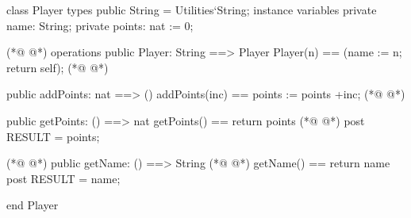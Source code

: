\begin{vdmpp}[breaklines=true]
class Player
types
public String = Utilities`String;
instance variables
   private name: String;
   private points: nat := 0;

(*@
\label{Player:8}
@*)
operations
   public Player: String ==> Player
   Player(n) == (name := n; return self); 
(*@
\label{addAttempts:11}
@*)
   
   public addPoints: nat ==> ()
   addPoints(inc) == points := points +inc;   
(*@
\label{addPoints:14}
@*)
   
   public getPoints: () ==> nat
    getPoints() == return points
(*@
\label{getPoints:17}
@*)
   post RESULT = points;

(*@
\label{getName:19}
@*)
   public getName: () ==> String
(*@
\label{getAttempts:20}
@*)
    getName() == return name
   post RESULT = name; 
   
end Player
\end{vdmpp}
